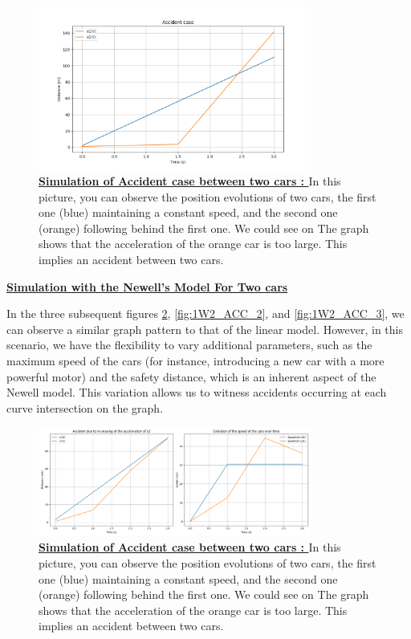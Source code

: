 \documentclass{article}
\begin{document}
		\begin{figure}[H]
			\centering
			\includegraphics[width=0.8\textwidth]{Acc1.png}
			\caption[Simulation of Accident case between two cars]{\textbf{\underline{Simulation of Accident case between two cars : }} In this picture, you can observe the position evolutions of two cars, the first one (blue) maintaining a constant speed, and the second one (orange) following behind the first one. We could see on The graph shows that the acceleration of the orange car is too large. This implies an accident between two cars.}
			\label{fig:Acc1}
		\end{figure}
		
		\textbf{\underline{Simulation with the Newell's Model For Two cars}} \newline\newline
		
		In the three subsequent figures \ref{fig:1W2_ACC_1}, \ref{fig:1W2_ACC_2}, and \ref{fig:1W2_ACC_3}, we can observe a similar graph pattern to that of the linear model. However, in this scenario, we have the flexibility to vary additional parameters, such as the maximum speed of the cars (for instance, introducing a new car with a more powerful motor) and the safety distance, which is an inherent aspect of the Newell model. This variation allows us to witness accidents occurring at each curve intersection on the graph.
		
		
		\begin{figure}[H]
			\centering
			\includegraphics[width=0.8\textwidth]{1W2_Acc1.png}
			\caption[Simulation of Accident case between two cars]{\textbf{\underline{Simulation of Accident case between two cars : }} In this picture, you can observe the position evolutions of two cars, the first one (blue) maintaining a constant speed, and the second one (orange) following behind the first one. We could see on The graph shows that the acceleration of the orange car is too large. This implies an accident between two cars.}
			\label{fig:1W2_ACC_1}
		\end{figure}
		
\end{document}
